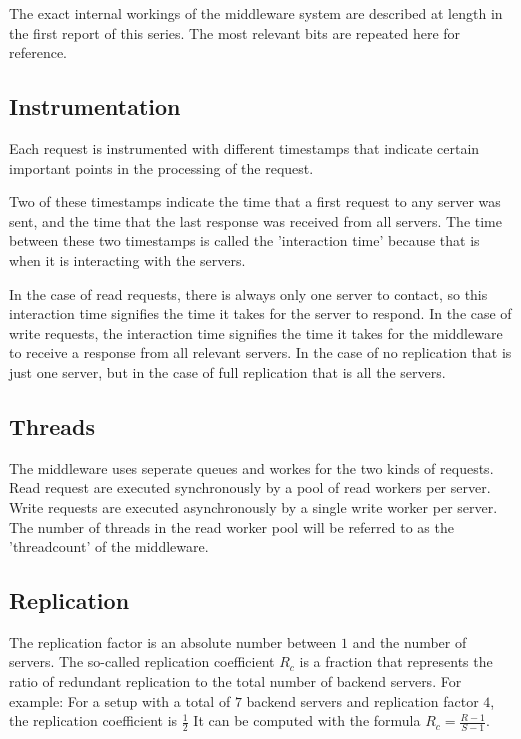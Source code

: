 \documentclass[11pt]{article}
\begin{document}
The exact internal workings of the middleware system are described at length in the first report of this series.
The most relevant bits are repeated here for reference.  


\subsection{Instrumentation}

Each request is instrumented with different timestamps that indicate certain important points in the processing of the request.

Two of these timestamps indicate the time that a first request to any server was sent, and the time that the last response was received from all servers.
The time between these two timestamps is called the 'interaction time' because that is when it is interacting with the servers.

In the case of read requests, there is always only one server to contact, so this interaction time signifies the time it takes for the server to respond.
In the case of write requests, the interaction time signifies the time it takes for the middleware to receive a response from all relevant servers.
In the case of no replication that is just one server, but in the case of full replication that is all the servers.

\subsection{Threads}

The middleware uses seperate queues and workes for the two kinds of requests.
Read request are executed synchronously by a pool of read workers per server.
Write requests are executed asynchronously by a single write worker per server.
The number of threads in the read worker pool will be referred to as the 'threadcount' of the middleware.

\subsection{Replication}

The replication factor is an absolute number between $1$ and the number of servers.
The so-called replication coefficient $R_c$ is a fraction that represents the ratio of redundant replication to the total number of backend servers. For example: For a setup with a total of $7$ backend servers and replication factor $4$, the replication coefficient is $\frac{1}{2}$
It can be computed with the formula $R_c = \frac{R - 1}{S - 1}$.
\end{document}
